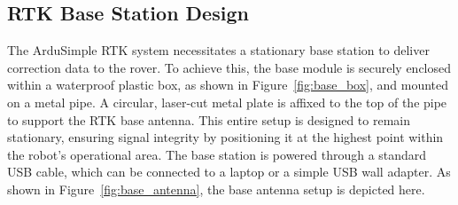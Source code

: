 \subsection{RTK Base Station Design}
\label{ssec:rtk_base_design}
The ArduSimple RTK system necessitates a stationary base station to deliver correction data to the rover. To achieve this, the base module is securely enclosed within a waterproof plastic box, as shown in Figure~\ref{fig:base_box}, and mounted on a metal pipe. A circular, laser-cut metal plate is affixed to the top of the pipe to support the RTK base antenna. This entire setup is designed to remain stationary, ensuring signal integrity by positioning it at the highest point within the robot's operational area. The base station is powered through a standard \gls{USB} cable, which can be connected to a laptop or a simple USB wall adapter. As shown in Figure~\ref{fig:base_antenna}, the base antenna setup is depicted here.

